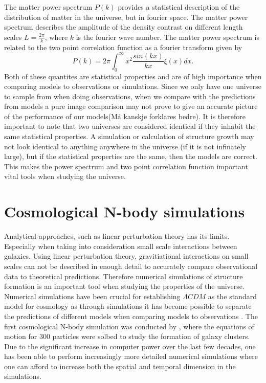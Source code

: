 The matter power spectrum $P(k)$ provides a statistical description of the
distribution of matter in the universe, but in fourier space. The matter power spectrum describes the amplitude of 
the density contrast on different length scales $L=\frac{2\pi}{k}$, where $k$ is
the fourier wave number. The matter power spectrum is related to the two point
correlation function as a fourier transform given by
\begin{equation}
    P(k)=2\pi\int_0^\infty x^2\frac{sin(kx)}{kx}\xi(x)dx.
\end{equation}
Both of these quantites are statistical properties and are of high importance
when comparing models to observations or simulations. Since we only have one
universe to sample from when doing observations, when we compare with the
predictions from models a pure image comparison may not prove to give an
accurate picture of the performance of our models(Må kanskje forklares bedre). It is therefore important to
note that two universes are considered identical if they inhabit the same
statistical properties. A simulation or calculation of structure growth may
not look identical to anything anywhere in the universe (if it is not infinately
large), but if the statistical properties are the same, then the models are
correct. This makes the power spectrum and two point correlation function
important vital tools when studying the universe.

\section{Cosmological N-body simulations}
Analytical approaches, such as linear perturbation theory has its limits.
Especially when taking into consideration small scale interactions between
galaxies. Using linear perturbation theory, gravitiational interactions on small scales can not be described in
enough detail to accurately compare observational data to theoretical
predictions. Therefore numerical simulations of structure formation is an
important tool when studying the properties of the universe. Numerical
simulations have been crucial for establishing $\Lambda CDM$ as the standard
model for cosmology as through simulations it has become possible to separate
the predictions of different models when comparing models to observations
\cite[p.~361]{schneider2006extragalactic}. The first cosmological N-body
simulation was conducted by \cite{PeeblesPJE1970SotC}, where the equations of
motion for $300$ particles were solbed to study the formation of galaxy clusters. Due to the significant increase in
computer power over the last few decades, one has been able to perform
increasingly more detailed numerical simulations where one can afford to
increase both the spatial and temporal dimension in the simulations.\\

